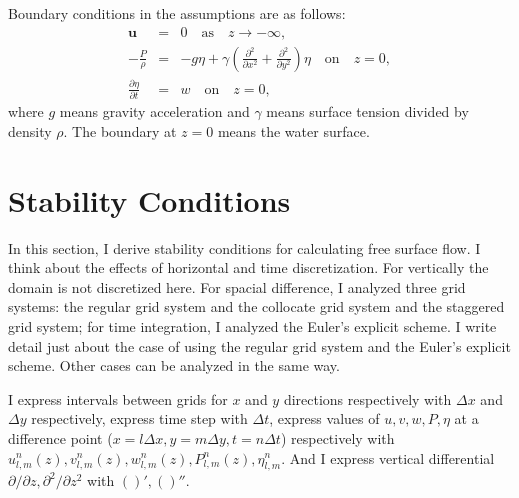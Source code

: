 \documentclass[a4paper,11pt]{article}
\newcommand{\as}{\quad\mathrm{as}\quad}
\newcommand{\on}{\quad\mathrm{on}\quad}
\begin{document}
Boundary conditions in the assumptions are as follows:
\begin{eqnarray}
 \bm{u} &=& 0 \as z \to -\infty, \\
- \frac{P}{\rho}
&=& - g\eta + \gamma \left(
  \frac{\partial^2}{\partial x^2} + \frac{\partial^2}{\partial y^2}
  \right) \eta \on z=0, \\
 \frac{\partial \eta}{\partial t}
&=& w \on z=0,
\end{eqnarray}
where $g$ means gravity acceleration and $\gamma$ means surface tension divided by density $\rho$. The boundary at $z=0$ means the water surface.

\section{Stability Conditions}

In this section, I derive stability conditions for calculating free surface flow.
I think about the effects of horizontal and time discretization. For vertically the domain is not discretized here.
For spacial difference, I analyzed three grid systems: the regular grid system and the collocate grid system and the staggered grid system;
for time integration, I analyzed the Euler's explicit scheme. I write detail just about the case of using the regular grid system and the Euler's explicit scheme. Other cases can be analyzed in the same way.

I express intervals between grids for $x$ and $y$ directions
respectively with $\Delta x$ and $\Delta y$ respectively,
express time step with $\Delta t$,
express values of $u, v, w, P, \eta$ at a difference point
($x = l \Delta x, y = m \Delta y, t = n \Delta t$) respectively with
$u^n_{l,m}(z), v^n_{l,m}(z), w^n_{l,m}(z), P^n_{l,m}(z), \eta^n_{l,m}$.
And I express vertical differential $\partial/\partial z,
\partial^2/\partial z^2$ with $()', ()''$.
\end{document}
